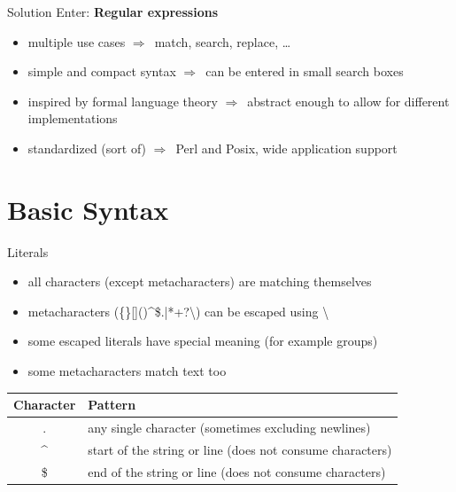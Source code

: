 \documentclass[10pt, graphics, aspectratio=169, table]{beamer}
\newcommand{\ra}{$\Rightarrow$\ }
\begin{document}
    \begin{frame}{Solution}
        Enter: \textbf{Regular expressions}
        \begin{itemize}
            \item multiple use cases \ra match, search, replace, \ldots
            \item simple and compact syntax \ra can be entered in small search boxes
            \item inspired by formal language theory \ra abstract enough to allow for different implementations
            \item standardized (sort of) \ra Perl and Posix, wide application support
        \end{itemize}
    \end{frame}


    \section{Basic Syntax}
    \begin{frame}{Literals}
        \begin{itemize}
            \item all characters (except metacharacters) are matching themselves
            \item metacharacters (\{\}[]()\textasciicircum\$.|*+?\textbackslash) can be escaped using \textbackslash
            \item some escaped literals have special meaning (for example groups)
            \item some metacharacters match text too
        \end{itemize}
        \begin{center}
            \begin{tabular}{cl}
                \toprule
                Character & Pattern \\
                \midrule
                . & any single character (sometimes excluding newlines) \\
                \textasciicircum & start of the string or line (does not consume characters) \\
                \$ & end of the string or line (does not consume characters) \\
                \bottomrule
            \end{tabular}
        \end{center}
    \end{frame}
\end{document}
